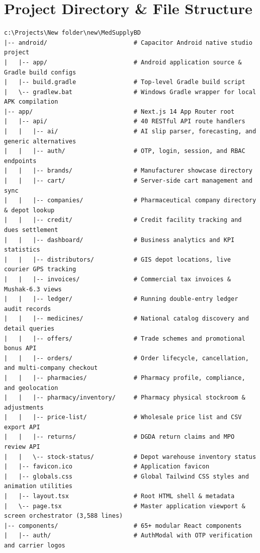 \documentclass[10pt,a4paper]{article}
\begin{document}
\section{Project Directory \& File Structure}
\begin{verbatim}
c:\Projects\New folder\new\MedSupplyBD
|-- android/                        # Capacitor Android native studio project
|   |-- app/                        # Android application source & Gradle build configs
|   |-- build.gradle                # Top-level Gradle build script
|   \-- gradlew.bat                 # Windows Gradle wrapper for local APK compilation
|-- app/                            # Next.js 14 App Router root
|   |-- api/                        # 40 RESTful API route handlers
|   |   |-- ai/                     # AI slip parser, forecasting, and generic alternatives
|   |   |-- auth/                   # OTP, login, session, and RBAC endpoints
|   |   |-- brands/                 # Manufacturer showcase directory
|   |   |-- cart/                   # Server-side cart management and sync
|   |   |-- companies/              # Pharmaceutical company directory & depot lookup
|   |   |-- credit/                 # Credit facility tracking and dues settlement
|   |   |-- dashboard/              # Business analytics and KPI statistics
|   |   |-- distributors/           # GIS depot locations, live courier GPS tracking
|   |   |-- invoices/               # Commercial tax invoices & Mushak-6.3 views
|   |   |-- ledger/                 # Running double-entry ledger audit records
|   |   |-- medicines/              # National catalog discovery and detail queries
|   |   |-- offers/                 # Trade schemes and promotional bonus API
|   |   |-- orders/                 # Order lifecycle, cancellation, and multi-company checkout
|   |   |-- pharmacies/             # Pharmacy profile, compliance, and geolocation
|   |   |-- pharmacy/inventory/     # Pharmacy physical stockroom & adjustments
|   |   |-- price-list/             # Wholesale price list and CSV export API
|   |   |-- returns/                # DGDA return claims and MPO review API
|   |   \-- stock-status/           # Depot warehouse inventory status
|   |-- favicon.ico                 # Application favicon
|   |-- globals.css                 # Global Tailwind CSS styles and animation utilities
|   |-- layout.tsx                  # Root HTML shell & metadata
|   \-- page.tsx                    # Master application viewport & screen orchestrator (3,588 lines)
|-- components/                     # 65+ modular React components
|   |-- auth/                       # AuthModal with OTP verification and carrier logos

\end{verbatim}
\end{document}
